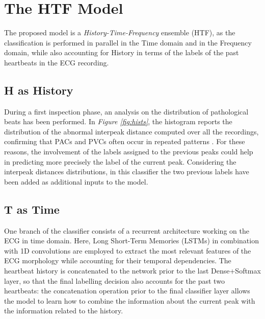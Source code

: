\documentclass[conference]{IEEEtran}
\newcommand{\fig}[1]{\textit{Figure \ref{#1}}}
\begin{document}
\section{The HTF Model}
    The proposed model is a \textit{History-Time-Frequency} ensemble (HTF), as
    the classification is performed in parallel in the Time domain and in the
    Frequency domain, while also accounting for History in terms of the labels 
    of the past heartbeats in the ECG recording. 

\subsection{H as History}
    During a first inspection phase, an analysis on the distribution of
    pathological beats has been performed. In \fig{fig:hists}, the histogram
    reports the distribution of the abnormal interpeak distance computed over all the
    recordings, confirming that PACs and PVCs often occur in repeated
    patterns \cite{premature_v} \cite{frequent_premature}. For these reasons, 
    the involvement of the labels
    assigned to the previous peaks could help in predicting more precisely
    the label of the current peak. Considering the interpeak distances distributions,
    in this classifier the two previous labels have been added as additional
    inputs to the model.

\subsection{T as Time}
    One branch of the classifier consists of a recurrent architecture working on
    the ECG in time domain. Here, Long Short-Term Memories (LSTMs) in
    combination with 1D convolutions are employed to extract the most relevant
    features of the ECG morphology while accounting for their temporal
    dependencies. The heartbeat history is concatenated to the network prior to
    the last Dense+Softmax layer, so that the final labelling decision also
    accounts for the past two heartbeats: the concatenation operation prior to
    the final classifier layer allows the model to learn how to combine the
    information about the current peak with the information related to the history.
\end{document}
